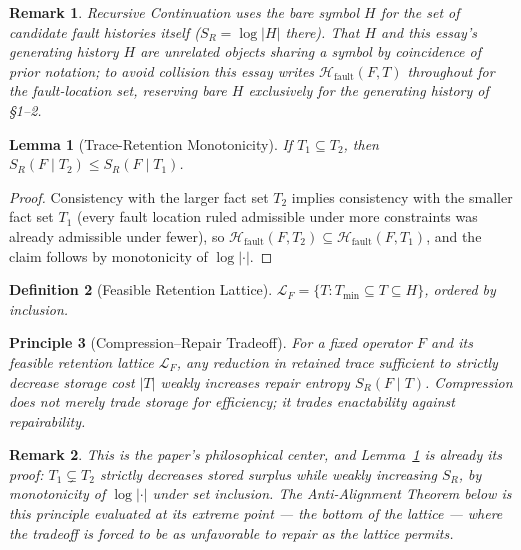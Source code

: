 \documentclass[11pt]{article}
\newtheorem{definition}{Definition}[section]
\newtheorem{lemma}[definition]{Lemma}
\newtheorem{principle}[definition]{Principle}
\newtheorem*{remark}{Remark}
\begin{document}
\begin{remark}
\emph{Recursive Continuation} uses the bare symbol $H$ for the set of candidate fault histories itself ($S_R=\log|H|$ there). That $H$ and this essay's generating history $H$ are unrelated objects sharing a symbol by coincidence of prior notation; to avoid collision this essay writes $\mathcal{H}_{\mathrm{fault}}(F,T)$ throughout for the fault-location set, reserving bare $H$ exclusively for the generating history of \S 1--2.
\end{remark}

\begin{lemma}[Trace-Retention Monotonicity]
\label{lem:monotone}
If $T_1\subseteq T_2$, then $S_R(F\mid T_2) \leq S_R(F\mid T_1)$.
\end{lemma}

\begin{proof}
Consistency with the larger fact set $T_2$ implies consistency with the smaller fact set $T_1$ (every fault location ruled admissible under more constraints was already admissible under fewer), so $\mathcal{H}_{\mathrm{fault}}(F,T_2)\subseteq\mathcal{H}_{\mathrm{fault}}(F,T_1)$, and the claim follows by monotonicity of $\log|\cdot|$.
\end{proof}

\begin{definition}[Feasible Retention Lattice]
$\mathcal{L}_F = \{T : T_{\min}\subseteq T\subseteq H\}$, ordered by inclusion.
\end{definition}

\begin{principle}[Compression--Repair Tradeoff]
\label{principle:tradeoff}
For a fixed operator $F$ and its feasible retention lattice $\mathcal{L}_F$, any reduction in retained trace sufficient to strictly decrease storage cost $|T|$ weakly increases repair entropy $S_R(F\mid T)$. Compression does not merely trade storage for efficiency; it trades enactability against repairability.
\end{principle}

\begin{remark}
This is the paper's philosophical center, and Lemma~\ref{lem:monotone} is already its proof: $T_1\subsetneq T_2$ strictly decreases stored surplus while weakly increasing $S_R$, by monotonicity of $\log|\cdot|$ under set inclusion. The Anti-Alignment Theorem below is this principle evaluated at its extreme point — the bottom of the lattice — where the tradeoff is forced to be as unfavorable to repair as the lattice permits.
\end{remark}
\end{document}
